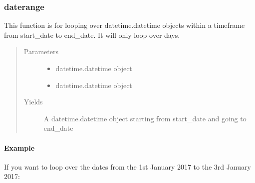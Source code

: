 \documentclass[letterpaper,10pt,english]{sphinxmanual}
\begin{document}
\subsubsection{daterange}
\label{\detokenize{generated/MPPy.tools.tools.daterange::doc}}\label{\detokenize{generated/MPPy.tools.tools.daterange:daterange}}

\begin{fulllineitems}
\label{\detokenize{generated/MPPy.tools.tools.daterange:MPPy.tools.tools.daterange}}
This function is for looping over datetime.datetime objects within a timeframe from start\_date to end\_date.
It will only loop over days.
\begin{quote}\begin{description}
\item[{Parameters}] \leavevmode\begin{itemize}
\item {} 
 \textendash{} datetime.datetime object

\item {} 
 \textendash{} datetime.datetime object

\end{itemize}

\item[{Yields}] \leavevmode
A datetime.datetime object starting from start\_date and going to end\_date

\end{description}\end{quote}
\paragraph{Example}

If you want to loop over the dates from the 1st January 2017 to the 3rd January 2017:

\begin{sphinxVerbatim}[commandchars=\\\{\}]
  
  
   
    
\end{sphinxVerbatim}

\end{fulllineitems}
\end{document}
